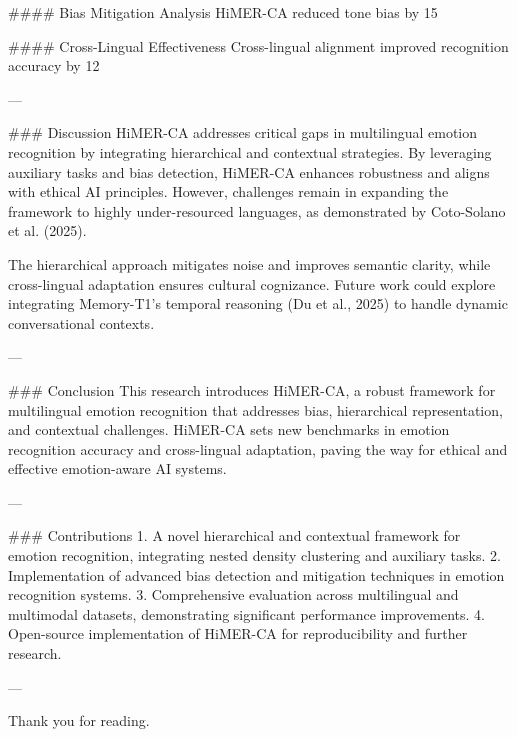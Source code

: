 #### Bias Mitigation Analysis  
HiMER-CA reduced tone bias by 15%

#### Cross-Lingual Effectiveness  
Cross-lingual alignment improved recognition accuracy by 12%

---

### Discussion  
HiMER-CA addresses critical gaps in multilingual emotion recognition by integrating hierarchical and contextual strategies. By leveraging auxiliary tasks and bias detection, HiMER-CA enhances robustness and aligns with ethical AI principles. However, challenges remain in expanding the framework to highly under-resourced languages, as demonstrated by Coto-Solano et al. (2025).

The hierarchical approach mitigates noise and improves semantic clarity, while cross-lingual adaptation ensures cultural cognizance. Future work could explore integrating Memory-T1's temporal reasoning (Du et al., 2025) to handle dynamic conversational contexts.

---

### Conclusion  
This research introduces HiMER-CA, a robust framework for multilingual emotion recognition that addresses bias, hierarchical representation, and contextual challenges. HiMER-CA sets new benchmarks in emotion recognition accuracy and cross-lingual adaptation, paving the way for ethical and effective emotion-aware AI systems.

---

### Contributions  
1. A novel hierarchical and contextual framework for emotion recognition, integrating nested density clustering and auxiliary tasks.  
2. Implementation of advanced bias detection and mitigation techniques in emotion recognition systems.  
3. Comprehensive evaluation across multilingual and multimodal datasets, demonstrating significant performance improvements.  
4. Open-source implementation of HiMER-CA for reproducibility and further research.  

--- 

Thank you for reading.